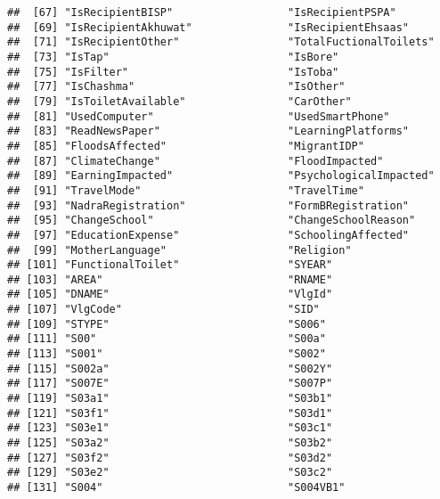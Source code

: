 \documentclass[
]{article}
\begin{document}
\begin{verbatim}
##  [67] "IsRecipientBISP"                  "IsRecipientPSPA"                 
##  [69] "IsRecipientAkhuwat"               "IsRecipientEhsaas"               
##  [71] "IsRecipientOther"                 "TotalFuctionalToilets"           
##  [73] "IsTap"                            "IsBore"                          
##  [75] "IsFilter"                         "IsToba"                          
##  [77] "IsChashma"                        "IsOther"                         
##  [79] "IsToiletAvailable"                "CarOther"                        
##  [81] "UsedComputer"                     "UsedSmartPhone"                  
##  [83] "ReadNewsPaper"                    "LearningPlatforms"               
##  [85] "FloodsAffected"                   "MigrantIDP"                      
##  [87] "ClimateChange"                    "FloodImpacted"                   
##  [89] "EarningImpacted"                  "PsychologicalImpacted"           
##  [91] "TravelMode"                       "TravelTime"                      
##  [93] "NadraRegistration"                "FormBRegistration"               
##  [95] "ChangeSchool"                     "ChangeSchoolReason"              
##  [97] "EducationExpense"                 "SchoolingAffected"               
##  [99] "MotherLanguage"                   "Religion"                        
## [101] "FunctionalToilet"                 "SYEAR"                           
## [103] "AREA"                             "RNAME"                           
## [105] "DNAME"                            "VlgId"                           
## [107] "VlgCode"                          "SID"                             
## [109] "STYPE"                            "S006"                            
## [111] "S00"                              "S00a"                            
## [113] "S001"                             "S002"                            
## [115] "S002a"                            "S002Y"                           
## [117] "S007E"                            "S007P"                           
## [119] "S03a1"                            "S03b1"                           
## [121] "S03f1"                            "S03d1"                           
## [123] "S03e1"                            "S03c1"                           
## [125] "S03a2"                            "S03b2"                           
## [127] "S03f2"                            "S03d2"                           
## [129] "S03e2"                            "S03c2"                           
## [131] "S004"                             "S004VB1"                         

\end{verbatim}
\end{document}
